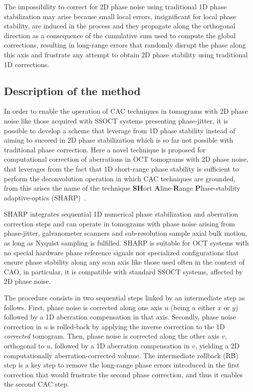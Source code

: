 The impossibility to correct for 2D phase noise using traditional 1D phase stabilization may arise because small local errors, insignificant for local phase stability, are induced in the process and they propagate along the orthogonal direction as a consequence of the cumulative sum used to compute the global corrections, resulting in long-range errors that randomly disrupt the phase along this axis and frustrate any attempt to obtain 2D phase stability using traditional 1D corrections.

\subsection{Description of the method}

In order to enable the operation of CAC techniques in tomograms with 2D phase noise like those acquired with SSOCT systems presenting phase-jitter, it is possible to develop a scheme that leverage from 1D phase stability instead of aiming to succeed in 2D phase stabilization which is so far not possible with traditional phase correction. Here a novel technique is proposed for computational correction of aberrations in OCT tomograms with 2D phase noise, that leverages from the fact that 1D short-range phase stability is sufficient to perform the deconvolution operation in which CAC techniques are grounded, from this arises the name of the technique \textbf{SH}ort \textbf{A}line-\textbf{R}ange \textbf{P}hase-stability adaptive-optics (SHARP)~\cite{Ruiz-Lopera2020_Computational}.

SHARP integrates sequential 1D numerical phase stabilization and aberration correction steps and can operate in tomograms with phase noise arising from phase-jitter, galvanometer scanners and sub-resolution sample axial bulk motion, as long as Nyquist sampling is fulfilled. SHARP is suitable for OCT systems with no special hardware phase reference signals nor specialized configurations that ensure phase stability along any scan axis like those used often in the context of CAO, in particular, it is compatible with standard SSOCT systems, affected by 2D phase noise.

The procedure consists in two sequential steps linked by an intermediate step as follows. First, phase noise is corrected along one axis $u$ (being $u$ either $x$ or $y$) followed by a 1D aberration compensation in that axis. Secondly, phase noise correction in $u$ is rolled-back by applying the inverse correction to the 1D \emph{corrected} tomogram. Then, phase noise is corrected along the other axis $v$, orthogonal to $u$, followed by a 1D aberration compensation in $v$, yielding a 2D computationally aberration-corrected volume. The intermediate rollback (RB) step is a key step to remove the long-range phase errors introduced in the first correction that would frustrate the second phase correction, and thus it enables the second CAC step.

